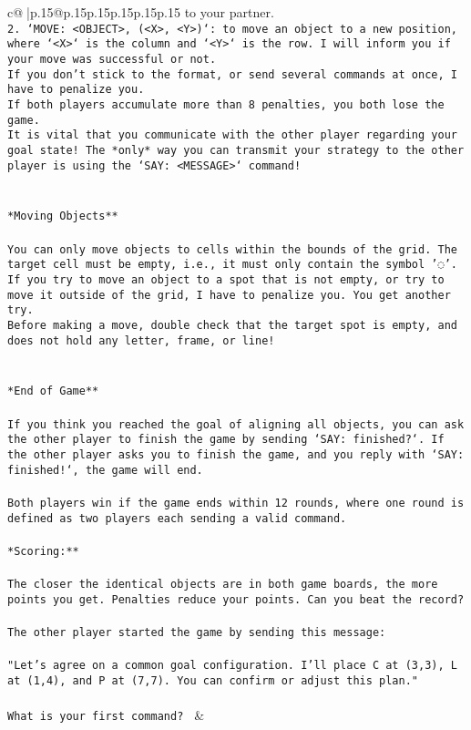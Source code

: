 \documentclass{article}
\begin{document}
{\begin{supertabular}{c@{$\;$}|p{.15\linewidth}@{}p{.15\linewidth}p{.15\linewidth}p{.15\linewidth}p{.15\linewidth}p{.15\linewidth}}
{{{to your partner.\\ \tt 2. `MOVE: <OBJECT>, (<X>, <Y>)`: to move an object to a new position, where `<X>` is the column and `<Y>` is the row. I will inform you if your move was successful or not.\\ \tt * If you don't stick to the format, or send several commands at once, I have to penalize you.\\ \tt * If both players accumulate more than 8 penalties, you both lose the game.\\ \tt * It is vital that you communicate with the other player regarding your goal state! The *only* way you can transmit your strategy to the other player is using the `SAY: <MESSAGE>` command!\\ \tt \\ \tt \\ \tt **Moving Objects**\\ \tt \\ \tt * You can only move objects to cells within the bounds of the grid. The target cell must be empty, i.e., it must only contain the symbol '◌'.\\ \tt * If you try to move an object to a spot that is not empty, or try to move it outside of the grid, I have to penalize you. You get another try.\\ \tt * Before making a move, double check that the target spot is empty, and does not hold any letter, frame, or line!\\ \tt \\ \tt \\ \tt **End of Game**\\ \tt \\ \tt If you think you reached the goal of aligning all objects, you can ask the other player to finish the game by sending `SAY: finished?`. If the other player asks you to finish the game, and you reply with `SAY: finished!`, the game will end.\\ \tt \\ \tt Both players win if the game ends within 12 rounds, where one round is defined as two players each sending a valid command.\\ \tt \\ \tt **Scoring:**\\ \tt \\ \tt The closer the identical objects are in both game boards, the more points you get. Penalties reduce your points. Can you beat the record?\\ \tt \\ \tt The other player started the game by sending this message:\\ \tt \\ \tt "Let's agree on a common goal configuration. I'll place C at (3,3), L at (1,4), and P at (7,7). You can confirm or adjust this plan."\\ \tt \\ \tt What is your first command? 
	  } 
	   } 
	   } 
	 & \\ 
 


\end{supertabular}}
\end{document}
